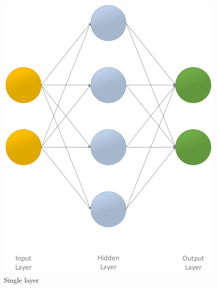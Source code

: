 \begin{figure}[!ht]
	\centering
	\begin{minipage}[b]{0.45\textwidth}
		\includegraphics[width=\textwidth]{img/ann_1h}
		\caption{Single layer }
		\label{fig:ann_1h}
	\end{minipage}
	\hfill
	\begin{minipage}[b]{0.45\textwidth}

\end{minipage}
\end{figure}
